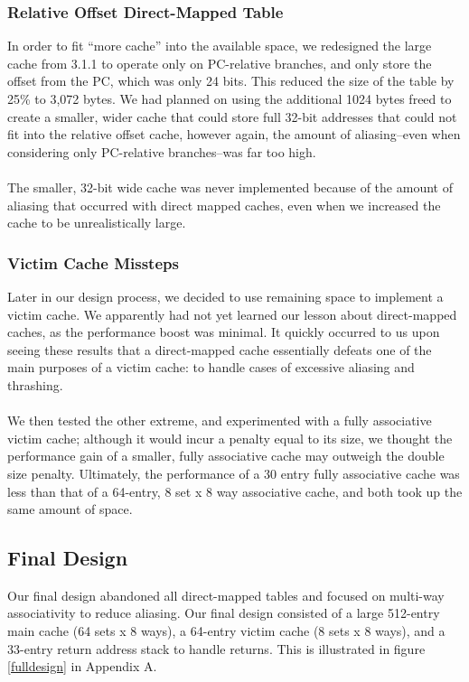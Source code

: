 \documentclass[twocolumn]{article}
\begin{document}
\subsubsection{Relative Offset Direct-Mapped Table}
In order to fit ``more cache'' into the available space, we redesigned the large cache from 3.1.1 to operate only on PC-relative branches, and only store the offset from the PC, which was only 24 bits.  This reduced the size of the table by 25\% to 3,072 bytes.  We had planned on using the additional 1024 bytes freed to create a smaller, wider cache that could store full 32-bit addresses that could not fit into the relative offset cache, however again, the amount of aliasing--even when considering only PC-relative branches--was far too high.\\\\
The smaller, 32-bit wide cache was never implemented because of the amount of aliasing that occurred with direct mapped caches, even when we increased the cache to be unrealistically large. 
\subsubsection{Victim Cache Missteps}
Later in our design process, we decided to use remaining space to implement a victim cache.  We apparently had not yet learned our lesson about direct-mapped caches, as the performance boost was minimal.  It quickly occurred to us upon seeing these results that a direct-mapped cache essentially defeats one of the main purposes of a victim cache: to handle cases of excessive aliasing and thrashing.\\\\
We then tested the other extreme, and experimented with a fully associative victim cache; although it would incur a penalty equal to its size, we thought the performance gain of a smaller, fully associative cache may outweigh the double size penalty.  Ultimately, the performance of a 30 entry fully associative cache was less than that of a 64-entry, 8 set x 8 way associative cache, and both took up the same amount of space. 
\subsection{Final Design}
Our final design abandoned all direct-mapped tables and focused on multi-way associativity to reduce aliasing.  Our final design consisted of a large 512-entry main cache (64 sets x 8 ways), a 64-entry victim cache (8 sets x 8 ways), and a 33-entry return address stack to handle returns.  This is illustrated in figure \ref{fulldesign} in Appendix A.
\end{document}
